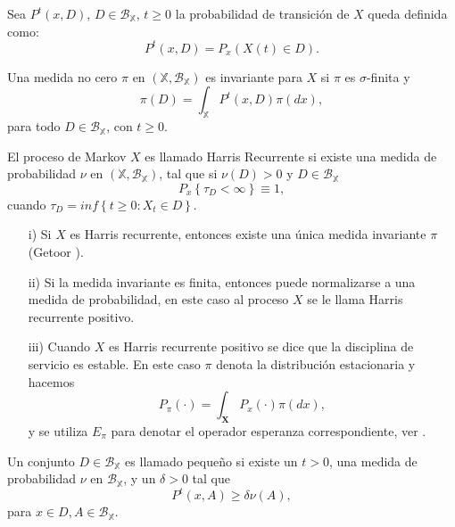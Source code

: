Sea $P^{t}\left(x,D\right)$, $D\in\mathcal{B}_{\mathbb{X}}$,
$t\geq0$ la probabilidad de transici\'on de $X$ queda definida
como:
\[P^{t}\left(x,D\right)=P_{x}\left(X\left(t\right)\in
D\right).\]


\begin{Def}
Una medida no cero $\pi$ en
$\left(\mathbb{X},\mathcal{B}_{\mathbb{X}}\right)$ es invariante
para $X$ si $\pi$ es $\sigma$-finita y
\[\pi\left(D\right)=\int_{\mathbb{X}}P^{t}\left(x,D\right)\pi\left(dx\right),\]
para todo $D\in \mathcal{B}_{\mathbb{X}}$, con $t\geq0$.
\end{Def}

\begin{Def}
El proceso de Markov $X$ es llamado Harris Recurrente si existe
una medida de probabilidad $\nu$ en
$\left(\mathbb{X},\mathcal{B}_{\mathbb{X}}\right)$, tal que si
$\nu\left(D\right)>0$ y $D\in\mathcal{B}_{\mathbb{X}}$
\[P_{x}\left\{\tau_{D}<\infty\right\}\equiv1,\] cuando
$\tau_{D}=inf\left\{t\geq0:X_{t}\in D\right\}$.
\end{Def}

\begin{Note}
\begin{itemize}
\item[i)] Si $X$ es Harris recurrente, entonces existe una \'unica
medida invariante $\pi$ (Getoor \cite{Getoor}).

\item[ii)] Si la medida invariante es finita, entonces puede
normalizarse a una medida de probabilidad, en este caso al proceso
$X$ se le llama Harris recurrente positivo.


\item[iii)] Cuando $X$ es Harris recurrente positivo se dice que
la disciplina de servicio es estable. En este caso $\pi$ denota la
distribuci\'on estacionaria y hacemos
\[P_{\pi}\left(\cdot\right)=\int_{\mathbf{X}}P_{x}\left(\cdot\right)\pi\left(dx\right),\]
y se utiliza $E_{\pi}$ para denotar el operador esperanza
correspondiente, ver \cite{DaiSean}.
\end{itemize}
\end{Note}

\begin{Def}\label{Def.Cto.Peq.}
Un conjunto $D\in\mathcal{B_{\mathbb{X}}}$ es llamado peque\~no si
existe un $t>0$, una medida de probabilidad $\nu$ en
$\mathcal{B_{\mathbb{X}}}$, y un $\delta>0$ tal que
\[P^{t}\left(x,A\right)\geq\delta\nu\left(A\right),\] para $x\in
D,A\in\mathcal{B_{\mathbb{X}}}$.
\end{Def}

